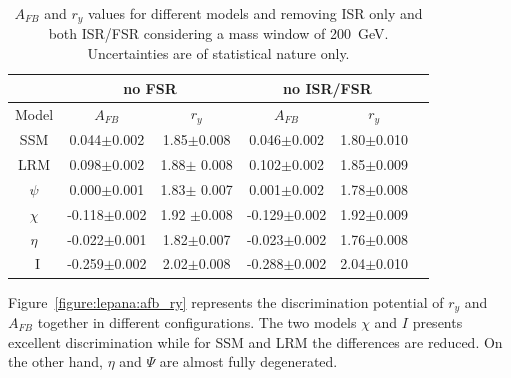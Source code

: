 \begin{table}
\caption{$A_{FB}$ and $r_y$ values for different models and removing ISR only and both ISR/FSR considering a mass window of 200~GeV. Uncertainties are of statistical nature only.}

\centering
\begin{tabular}{| c | c | c | c | c | c |} \hline\hline
 & \multicolumn{2}{c|}{no FSR} & \multicolumn{2}{c|}{no ISR/FSR}\\

\hline
  Model &  $A_{FB}$                &  $r_y$                    &  $A_{FB}$   &  $r_y$      \\
\hline
SSM    &   0.044$\pm$0.002    &  1.85$\pm$0.008  &  0.046$\pm$0.002  &  1.80$\pm$0.010   \\
LRM    &   0.098$\pm$0.002    &  1.88$\pm$ 0.008 &  0.102$\pm$0.002  &  1.85$\pm$0.009 \\
$\psi$  &   0.000$\pm$0.001    &  1.83$\pm$ 0.007 &   0.001$\pm$0.002 &  1.78$\pm$0.008\\
$\chi$  &   -0.118$\pm$0.002   &  1.92 $\pm$0.008 &  -0.129$\pm$0.002 &  1.92$\pm$0.009\\
$\eta$  &   -0.022$\pm$0.001  & 1.82$\pm$0.007   &  -0.023$\pm$0.002 &  1.76$\pm$0.008 \\
~I         &   -0.259$\pm$0.002  &  2.02$\pm$0.008  &   -0.288$\pm$0.002 &  2.04$\pm$0.010\\
\hline\hline
\end{tabular}
\label{tab:leptonicresonances:comp2}
\end{table}




\label{subsubsection:results}

Figure~\ref{figure:lepana:afb_ry} represents the discrimination potential of $r_y$ and $A_{FB}$ together in different configurations. The two models $\chi$ and $I$ presents excellent discrimination while for SSM and LRM 
the differences are reduced. On the other hand, $\eta$ and $\Psi$ are almost fully degenerated.  


